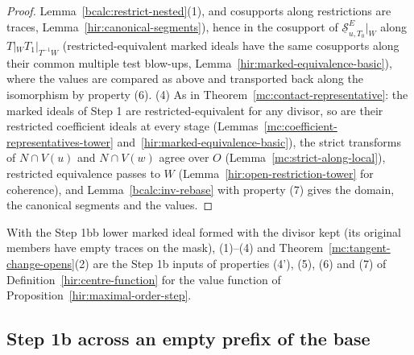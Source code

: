 \begin{proof}
Lemma~\ref{bcalc:restrict-nested}(1), and cosupports along restrictions are traces, Lemma~\ref{hir:canonical-segments}), hence in the cosupport of
\(\underline{\mathcal S}^E_{u,T_0}|_W\) along \(T|_WT_1|_{T^{-1}W}\) (restricted-equivalent marked ideals have the same cosupports along their common multiple test blow-ups,
Lemma~\ref{hir:marked-equivalence-basic}), where the values are compared as above and transported back along the isomorphism by property (6).
(4) As in Theorem~\ref{mc:contact-representative}: the marked ideals of Step 1 are restricted-equivalent for any divisor, so are their restricted coefficient ideals at every
stage (Lemmas~\ref{mc:coefficient-representatives-tower} and~\ref{hir:marked-equivalence-basic}), the strict transforms of \(N\cap V(u)\) and \(N\cap V(w)\) agree over \(O\)
(Lemma~\ref{mc:strict-along-local}), restricted equivalence passes to \(W\) (Lemma~\ref{hir:open-restriction-tower} for coherence), and Lemma~\ref{bcalc:inv-rebase} with property (7)
gives the domain, the canonical segments and the values.
\end{proof}
With the Step 1bb lower marked ideal formed with the divisor kept (its original members have empty traces on the mask), (1)--(4) and
Theorem~\ref{mc:tangent-change-opens}(2) are the Step 1b inputs of properties (4'), (5), (6) and (7) of Definition~\ref{hir:centre-function} for the value function of
Proposition~\ref{hir:maximal-order-step}.

\subsection{Step 1b across an empty prefix of the base}

